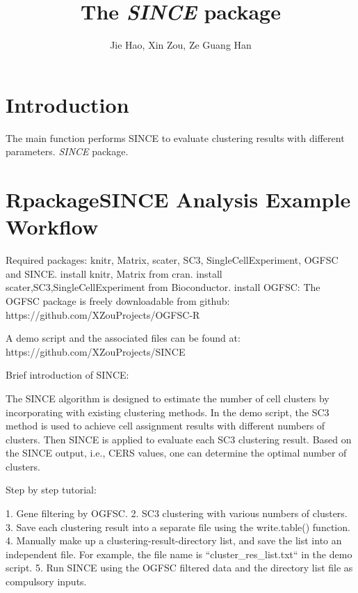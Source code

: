 \documentclass[11pt]{article}\usepackage[]{graphicx}\usepackage[]{color}
\newcommand{\Rpackage}[1]{{\textit{#1}}}
\begin{document}

\title{The \Rpackage{SINCE} package}
\author{Jie Hao, Xin Zou, Ze Guang Han}
\maketitle


\section{Introduction}

The main function performs SINCE to evaluate clustering results with different parameters.
\Rpackage{SINCE} package.



\section{Rpackage{SINCE} Analysis Example Workflow}

Required packages: knitr, Matrix, scater, SC3, SingleCellExperiment, OGFSC and SINCE.
install knitr, Matrix from cran.
install scater,SC3,SingleCellExperiment from Bioconductor.
install OGFSC: The OGFSC package is freely downloadable from github: https://github.com/XZouProjects/OGFSC-R

A demo script and the associated files can be found at: https://github.com/XZouProjects/SINCE

Brief introduction of SINCE:

The SINCE algorithm is designed to estimate the number of cell clusters by incorporating with existing clustering methods. In the demo script, the SC3 method is used to achieve cell assignment results with different numbers of clusters. Then SINCE is applied to evaluate each SC3 clustering result. Based on the SINCE output, i.e., CERS values, one can determine the optimal number of clusters.

Step by step tutorial:

1. Gene filtering by OGFSC.
2. SC3 clustering with various numbers of clusters. 
3. Save each clustering result into a separate file using the write.table() function.
4. Manually make up a clustering-result-directory list, and save the list into an independent file. For example, the file name is ``cluster\_res\_list.txt`` in the demo script.
5. Run SINCE using the OGFSC filtered data and the directory list file as compulsory inputs. 
\end{document}
